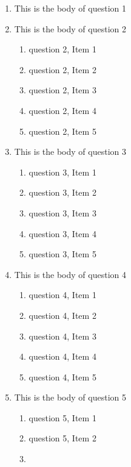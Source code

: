 \documentclass{article}
\begin{document}
\begin{enumerate}

\item
This is the body of question 1

\item
This is the body of question 2
    \begin{enumerate}
    \item
    question 2, Item 1
    \item
    question 2, Item 2
    \item
    question 2, Item 3
    \item
    question 2, Item 4
    \item
    question 2, Item 5
    \end{enumerate}
\item
This is the body of question 3
    \begin{enumerate}
    \item
    question 3, Item 1
    \item
    question 3, Item 2
    \item
    question 3, Item 3
    \item
    question 3, Item 4
    \item
    question 3, Item 5
    \end{enumerate}
\item
This is the body of question 4
    \begin{enumerate}
    \item
    question 4, Item 1
    \item
    question 4, Item 2
    \item
    question 4, Item 3
    \item
    question 4, Item 4
    \item
    question 4, Item 5
    \end{enumerate}
\item
This is the body of question 5
    \begin{enumerate}
    \item
    question 5, Item 1
    \item
    question 5, Item 2
    \item

\end{enumerate}
\end{enumerate}
\end{document}
